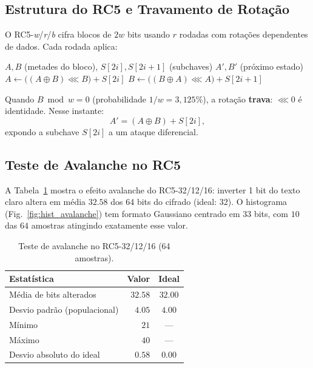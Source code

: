 \documentclass[12pt,a4paper]{article}
\theoremstyle{plain}
\begin{document}
\subsection{Estrutura do RC5 e Travamento de Rotação}

O RC5-\emph{w}/\emph{r}/\emph{b} cifra blocos de $2w$ bits usando
$r$ rodadas com rotações dependentes de dados. Cada rodada aplica:

\begin{algorithm}[htbp]
\caption{RC5: cifragem de uma rodada}
\label{alg:rc5_round}
\begin{algorithmic}[1]
\Require $A,B$ (metades do bloco), $S[2i],S[2i+1]$ (subchaves)
\Ensure $A',B'$ (próximo estado)
\State $A \gets \bigl((A \oplus B) \lll B\bigr) + S[2i]$
\State $B \gets \bigl((B \oplus A) \lll A\bigr) + S[2i+1]$
\end{algorithmic}
\end{algorithm}

Quando $B \bmod w = 0$ (probabilidade $1/w = 3{,}125\%$), a rotação
\textbf{trava}: $\lll 0$ é identidade. Nesse instante:
\[
A' = (A \oplus B) + S[2i],
\]
expondo a subchave $S[2i]$ a um ataque diferencial.

\subsection{Teste de Avalanche no RC5}

A Tabela~\ref{tab:avalanche} mostra o efeito avalanche do RC5-32/12/16:
inverter 1 bit do texto claro altera em média $32.58$ dos 64 bits do
cifrado (ideal: $32$). O histograma (Fig.~\ref{fig:hist_avalanche}) tem
formato Gaussiano centrado em $33$ bits, com $10$ das $64$ amostras
atingindo exatamente esse valor.

\begin{table}[htbp]
\centering
\caption{Teste de avalanche no RC5-32/12/16 (64 amostras).}
\label{tab:avalanche}
\begin{tabular}{lrc}
\hline
Estatística & Valor & Ideal \\
\hline
Média de bits alterados & $32.58$ & $32.00$ \\
Desvio padrão (populacional) & $4.05$ & $4.00$ \\
Mínimo & $21$ & --- \\
Máximo & $40$ & --- \\
Desvio absoluto do ideal & $0.58$ & $0.00$ \\
\hline
\end{tabular}
\end{table}
\end{document}
